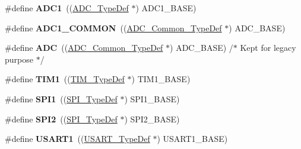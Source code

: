 \begin{DoxyCompactItemize}
\item 
\mbox{\label{group___peripheral__declaration_ga90d2d5c526ce5c0a551f533eccbee71a}} 
\#define {\bfseries A\+D\+C1}~((\hyperlink{struct_a_d_c___type_def}{A\+D\+C\+\_\+\+Type\+Def} $\ast$) A\+D\+C1\+\_\+\+B\+A\+SE)
\item 
\mbox{\label{group___peripheral__declaration_gaf1919c64fc774aab31190346fd5457e2}} 
\#define {\bfseries A\+D\+C1\+\_\+\+C\+O\+M\+M\+ON}~((\hyperlink{struct_a_d_c___common___type_def}{A\+D\+C\+\_\+\+Common\+\_\+\+Type\+Def} $\ast$) A\+D\+C\+\_\+\+B\+A\+SE)
\item 
\mbox{\label{group___peripheral__declaration_ga54d148b91f3d356713f7e367a2243bea}} 
\#define {\bfseries A\+DC}~((\hyperlink{struct_a_d_c___common___type_def}{A\+D\+C\+\_\+\+Common\+\_\+\+Type\+Def} $\ast$) A\+D\+C\+\_\+\+B\+A\+SE) /$\ast$ Kept for legacy purpose $\ast$/
\item 
\mbox{\label{group___peripheral__declaration_ga2e87451fea8dc9380056d3cfc5ed81fb}} 
\#define {\bfseries T\+I\+M1}~((\hyperlink{struct_t_i_m___type_def}{T\+I\+M\+\_\+\+Type\+Def} $\ast$) T\+I\+M1\+\_\+\+B\+A\+SE)
\item 
\mbox{\label{group___peripheral__declaration_gad483be344a28ac800be8f03654a9612f}} 
\#define {\bfseries S\+P\+I1}~((\hyperlink{struct_s_p_i___type_def}{S\+P\+I\+\_\+\+Type\+Def} $\ast$) S\+P\+I1\+\_\+\+B\+A\+SE)
\item 
\mbox{\label{group___peripheral__declaration_gaf2c3d8ce359dcfbb2261e07ed42af72b}} 
\#define {\bfseries S\+P\+I2}~((\hyperlink{struct_s_p_i___type_def}{S\+P\+I\+\_\+\+Type\+Def} $\ast$) S\+P\+I2\+\_\+\+B\+A\+SE)
\item 
\mbox{\label{group___peripheral__declaration_ga92871691058ff7ccffd7635930cb08da}} 
\#define {\bfseries U\+S\+A\+R\+T1}~((\hyperlink{struct_u_s_a_r_t___type_def}{U\+S\+A\+R\+T\+\_\+\+Type\+Def} $\ast$) U\+S\+A\+R\+T1\+\_\+\+B\+A\+SE)
\item 
\mbox{\label{group___peripheral__declaration_ga73ec606e7dacf17e18c661e8ff8c7c8d}} 

\end{DoxyCompactItemize}

